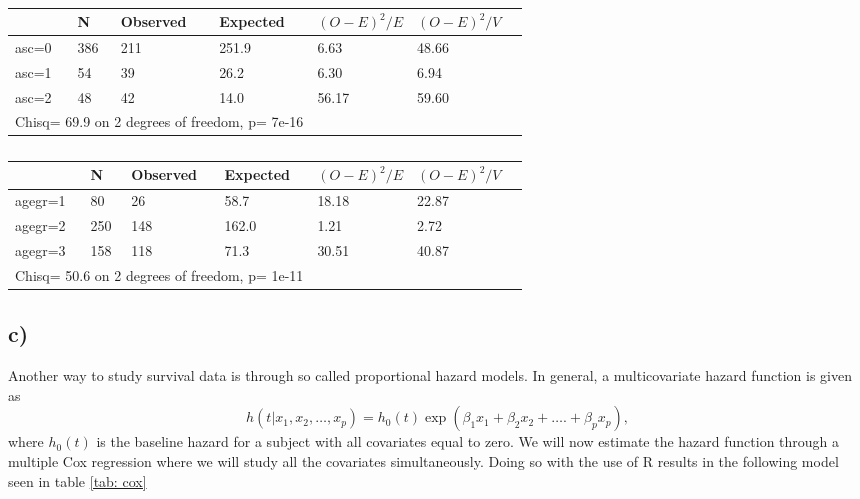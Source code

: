 \documentclass[a4paper, 10pt, reqno]{amsart}
\begin{document}
\begin{table}
\caption{}
\label{tab: asc}
\begin{tabular}{lllllll}
\hline\hline
 & N  & Observed & Expected &$(O-E)^2/E$ & $(O-E)^2/V$\\ \hline
asc=0& 386    &  211   & 251.9   &   6.63  &   48.66\\
asc=1 & 54    &   39   &  26.2   &   6.30  &    6.94\\
asc=2&  48    &   42    & 14.0   &  56.17  &   59.60\\
\multicolumn{4}{l}{Chisq= 69.9  on 2 degrees of freedom, p= 7e-16}\\
\hline

\end{tabular}
\end{table}

\begin{table}
\caption{}
\label{tab: agegr}
\begin{tabular}{lllllll}
\hline\hline
 & N  & Observed & Expected &$(O-E)^2/E$ & $(O-E)^2/V$\\ \hline
agegr=1&  80     &  26  &   58.7   &  18.18   &  22.87\\
agegr=2 &250    &  148   & 162.0   &   1.21   &   2.72\\
agegr=3& 158    &  118   &  71.3   & 30.51   &  40.87\\
\multicolumn{4}{l}{Chisq= 50.6  on 2 degrees of freedom, p= 1e-11 }\\
\hline

\end{tabular}
\end{table}


\subsection{c)}

Another way to study survival data is through so called proportional hazard models. In general, a multicovariate hazard function is given as
\begin{equation}
    h\left(t | x_{1}, x_{2}, \ldots, x_{p}\right)=h_{0}(t) \exp \left(\beta_{1} x_{1}+\beta_{2} x_{2}+\ldots .+\beta_{p} x_{p}\right),
\end{equation}
where $h_0(t)$ is the baseline hazard for a subject with all covariates equal to zero. We will now estimate the hazard function through a multiple Cox regression where we will study all the covariates simultaneously. Doing so with the use of R results in the following model seen in table \ref{tab: cox}
\end{document}
